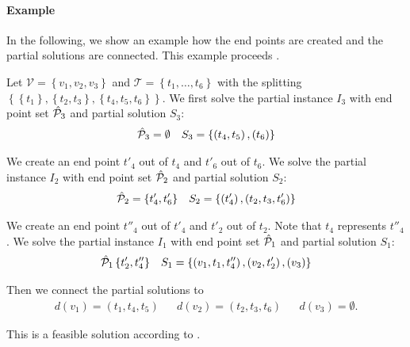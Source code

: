 \paragraph{Example} \parfill

In the following, we show an example how the end points are created and the partial solutions are connected. This example proceeds .

\begin{example}

Let ${\mathcal{V}=\left\{v_1,v_2,v_3\right\}}$ and ${\mathcal{T}=\left\{t_1,\dots,t_6\right\}}$ with the splitting $\left\{\left\{t_1\right\},\left\{t_2,t_3\right\},\left\{t_4,t_5,t_6\right\}\right\}$. We first solve the partial instance $I_3$ with end point set $\hat{\mathcal{P}}_3$ and partial solution $S_3$:
\begin{align*}
	\hat{\mathcal{P}}_3 = \emptyset && S_3 = \left\{\left(t_4, t_5\right), \left(t_6\right)\right\}
\end{align*}

We create an end point $t'_4$ out of $t_4$ and $t'_6$ out of $t_6$. We solve the partial instance $I_2$ with end point set $\hat{\mathcal{P}}_2$ and partial solution $S_2$:
\begin{align*}
	\hat{\mathcal{P}}_2 = \left\{t'_4,t'_6\right\} && S_2 = \left\{\left(t'_4\right), \left(t_2,t_3,t'_6\right)\right\}
\end{align*}

We create an end point $t''_4$ out of $t'_4$ and $t'_2$ out of $t_2$. Note that $t_4$ represents $t''_4$. We solve the partial instance $I_1$ with end point set $\hat{\mathcal{P}}_1$ and partial solution $S_1$:
\begin{align*}
	\hat{\mathcal{P}}_1\left\{t'_2,t''_4\right\} && S_1 = \left\{\left(v_1,t_1,t''_4\right), \left(v_2,t'_2\right), \left(v_3\right)\right\}
\end{align*}

Then we connect the partial solutions to 
\begin{align*}
	d\left(v_1\right) = \left(t_1,t_4,t_5\right) && d\left(v_2\right) = \left(t_2,t_3,t_6\right) && d\left(v_3\right) = \emptyset.
\end{align*}

This is a feasible solution according to .

\end{example}


